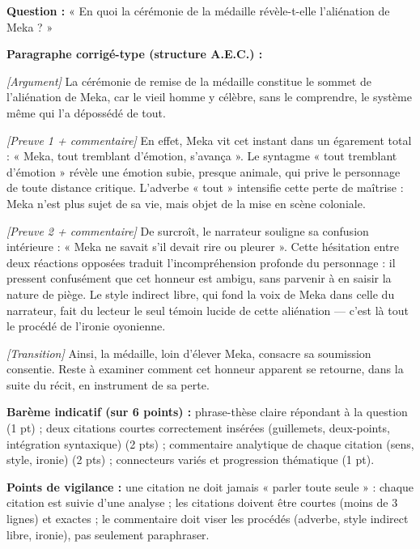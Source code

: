 \documentclass[11pt]{article}
\begin{document}
\begin{corrige}
\textbf{Question :} « En quoi la cérémonie de la médaille révèle-t-elle l'aliénation de Meka ? »

\textbf{Paragraphe corrigé-type (structure A.E.C.) :}

\emph{[Argument]} La cérémonie de remise de la médaille constitue le sommet de l'aliénation de Meka, car le vieil homme y célèbre, sans le comprendre, le système même qui l'a dépossédé de tout.

\emph{[Preuve 1 + commentaire]} En effet, Meka vit cet instant dans un égarement total : « Meka, tout tremblant d'émotion, s'avança ». Le syntagme « tout tremblant d'émotion » révèle une émotion subie, presque animale, qui prive le personnage de toute distance critique. L'adverbe « tout » intensifie cette perte de maîtrise : Meka n'est plus sujet de sa vie, mais objet de la mise en scène coloniale.

\emph{[Preuve 2 + commentaire]} De surcroît, le narrateur souligne sa confusion intérieure : « Meka ne savait s'il devait rire ou pleurer ». Cette hésitation entre deux réactions opposées traduit l'incompréhension profonde du personnage : il pressent confusément que cet honneur est ambigu, sans parvenir à en saisir la nature de piège. Le style indirect libre, qui fond la voix de Meka dans celle du narrateur, fait du lecteur le seul témoin lucide de cette aliénation — c'est là tout le procédé de l'ironie oyonienne.

\emph{[Transition]} Ainsi, la médaille, loin d'élever Meka, consacre sa soumission consentie. Reste à examiner comment cet honneur apparent se retourne, dans la suite du récit, en instrument de sa perte.

\textbf{Barème indicatif (sur 6 points) :} phrase-thèse claire répondant à la question (1 pt) ; deux citations courtes correctement insérées (guillemets, deux-points, intégration syntaxique) (2 pts) ; commentaire analytique de chaque citation (sens, style, ironie) (2 pts) ; connecteurs variés et progression thématique (1 pt).

\textbf{Points de vigilance :} une citation ne doit jamais « parler toute seule » : chaque citation est suivie d'une analyse ; les citations doivent être courtes (moins de 3 lignes) et exactes ; le commentaire doit viser les procédés (adverbe, style indirect libre, ironie), pas seulement paraphraser.
\end{corrige}
\end{document}
